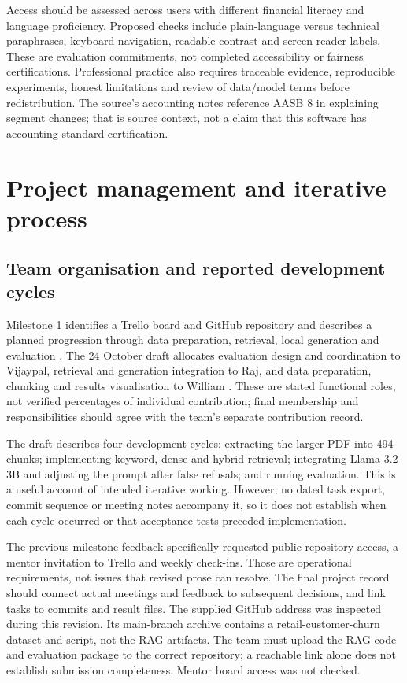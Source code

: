 \documentclass[11pt,a4paper]{article}
\begin{document}
Access should be assessed across users with different financial literacy and language proficiency. Proposed checks include plain-language versus technical paraphrases, keyboard navigation, readable contrast and screen-reader labels. These are evaluation commitments, not completed accessibility or fairness certifications. Professional practice also requires traceable evidence, reproducible experiments, honest limitations and review of data/model terms before redistribution. The source's accounting notes reference AASB 8 in explaining segment changes; that is source context, not a claim that this software has accounting-standard certification.

\section{Project management and iterative process}
\subsection{Team organisation and reported development cycles}
Milestone 1 identifies a Trello board and GitHub repository and describes a planned progression through data preparation, retrieval, local generation and evaluation \cite{milestone}. The 24 October draft allocates evaluation design and coordination to Vijaypal, retrieval and generation integration to Raj, and data preparation, chunking and results visualisation to William \cite{vijay}. These are stated functional roles, not verified percentages of individual contribution; final membership and responsibilities should agree with the team's separate contribution record.

The draft describes four development cycles: extracting the larger PDF into 494 chunks; implementing keyword, dense and hybrid retrieval; integrating Llama 3.2 3B and adjusting the prompt after false refusals; and running evaluation. This is a useful account of intended iterative working. However, no dated task export, commit sequence or meeting notes accompany it, so it does not establish when each cycle occurred or that acceptance tests preceded implementation.

The previous milestone feedback specifically requested public repository access, a mentor invitation to Trello and weekly check-ins. Those are operational requirements, not issues that revised prose can resolve. The final project record should connect actual meetings and feedback to subsequent decisions, and link tasks to commits and result files. The supplied GitHub address was inspected during this revision. Its main-branch archive contains a retail-customer-churn dataset and script, not the RAG artifacts. The team must upload the RAG code and evaluation package to the correct repository; a reachable link alone does not establish submission completeness. Mentor board access was not checked.
\end{document}
